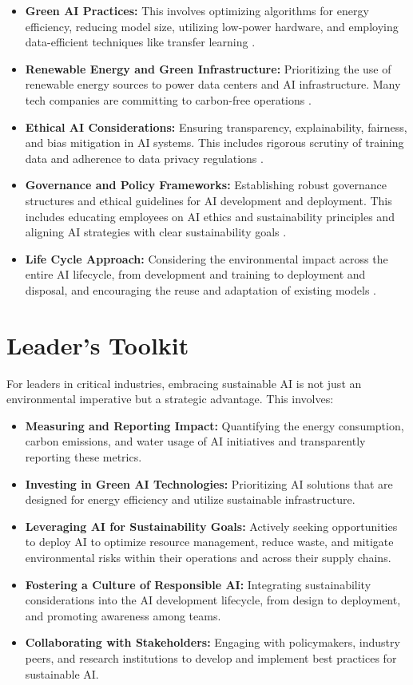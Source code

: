 \begin{itemize}
    \item \textbf{Green AI Practices:} This involves optimizing algorithms for energy efficiency, reducing model size, utilizing low-power hardware, and employing data-efficient techniques like transfer learning \parencite{AccessPartnership2023}.
    \item \textbf{Renewable Energy and Green Infrastructure:} Prioritizing the use of renewable energy sources to power data centers and AI infrastructure. Many tech companies are committing to carbon-free operations \parencite{Exaud2023}.
    \item \textbf{Ethical AI Considerations:} Ensuring transparency, explainability, fairness, and bias mitigation in AI systems. This includes rigorous scrutiny of training data and adherence to data privacy regulations \parencite{AlgorithmWatch2023}.
    \item \textbf{Governance and Policy Frameworks:} Establishing robust governance structures and ethical guidelines for AI development and deployment. This includes educating employees on AI ethics and sustainability principles and aligning AI strategies with clear sustainability goals \parencite{PMI2025}.
    \item \textbf{Life Cycle Approach:} Considering the environmental impact across the entire AI lifecycle, from development and training to deployment and disposal, and encouraging the reuse and adaptation of existing models \parencite{ProfileTree2023}.
\end{itemize}

\section{Leader's Toolkit}
\label{sec:sustainability_leaders_toolkit}
For leaders in critical industries, embracing sustainable AI is not just an environmental imperative but a strategic advantage. This involves:
\begin{itemize}
    \item \textbf{Measuring and Reporting Impact:} Quantifying the energy consumption, carbon emissions, and water usage of AI initiatives and transparently reporting these metrics.
    \item \textbf{Investing in Green AI Technologies:} Prioritizing AI solutions that are designed for energy efficiency and utilize sustainable infrastructure.
    \item \textbf{Leveraging AI for Sustainability Goals:} Actively seeking opportunities to deploy AI to optimize resource management, reduce waste, and mitigate environmental risks within their operations and across their supply chains.
    \item \textbf{Fostering a Culture of Responsible AI:} Integrating sustainability considerations into the AI development lifecycle, from design to deployment, and promoting awareness among teams.
    \item \textbf{Collaborating with Stakeholders:} Engaging with policymakers, industry peers, and research institutions to develop and implement best practices for sustainable AI.
\end{itemize}
